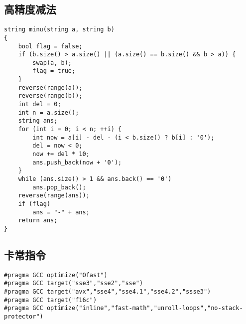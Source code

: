 \documentclass[twocolumn,a4]{article}
\begin{document}
\subsection{高精度减法}
\begin{lstlisting}
string minu(string a, string b)
{
    bool flag = false;
    if (b.size() > a.size() || (a.size() == b.size() && b > a)) {
        swap(a, b);
        flag = true;
    }
    reverse(range(a));
    reverse(range(b));
    int del = 0;
    int n = a.size();
    string ans;
    for (int i = 0; i < n; ++i) {
        int now = a[i] - del - (i < b.size() ? b[i] : '0');
        del = now < 0;
        now += del * 10;
        ans.push_back(now + '0');
    }
    while (ans.size() > 1 && ans.back() == '0')
        ans.pop_back();
    reverse(range(ans));
    if (flag)
        ans = "-" + ans;
    return ans;
}
\end{lstlisting}


\subsection{卡常指令}
\begin{lstlisting}
#pragma GCC optimize("Ofast")
#pragma GCC target("sse3","sse2","sse")
#pragma GCC target("avx","sse4","sse4.1","sse4.2","ssse3")
#pragma GCC target("f16c")
#pragma GCC optimize("inline","fast-math","unroll-loops","no-stack-protector")
\end{lstlisting}
\end{document}
